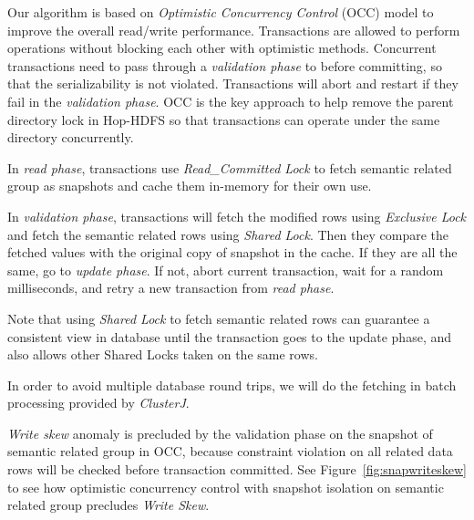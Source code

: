 Our algorithm is based on \textit{Optimistic Concurrency Control} (OCC) model to improve the overall read/write performance. Transactions are allowed to perform operations without blocking each other with optimistic methods. Concurrent transactions need to pass through a \textit{validation phase} to before committing, so that the serializability is not violated. Transactions will abort and restart if they fail in the \textit{validation phase}. OCC is the key approach to help remove the parent directory lock in Hop-HDFS so that transactions can operate under the same directory concurrently.

\noindent In \textit{read phase}, transactions use \textit{Read\_Committed Lock} to fetch semantic related group as snapshots and cache them in-memory for their own use.

\noindent In \textit{validation phase}, transactions will fetch the modified rows using \textit{Exclusive Lock} and fetch the semantic related rows using \textit{Shared Lock}. Then they compare the fetched values with the original copy of snapshot in the cache. If they are all the same, go to \textit{update phase}. If not, abort current transaction, wait for a random milliseconds, and retry a new transaction from \textit{read phase}.

\noindent Note that using \textit{Shared Lock} to fetch semantic related rows can guarantee a consistent view in database until the transaction goes to the update phase, and also allows other Shared Locks taken on the same rows. 

\noindent In order to avoid multiple database round trips, we will do the fetching in batch processing provided by \textit{ClusterJ}.

\noindent \textit{Write skew} anomaly is precluded by the validation phase on the snapshot of semantic related group in OCC, because constraint violation on all related data rows will be checked before transaction committed. See Figure~\ref{fig:snapwriteskew} to see how optimistic concurrency control with snapshot isolation on semantic related group precludes \textit{Write Skew}.

